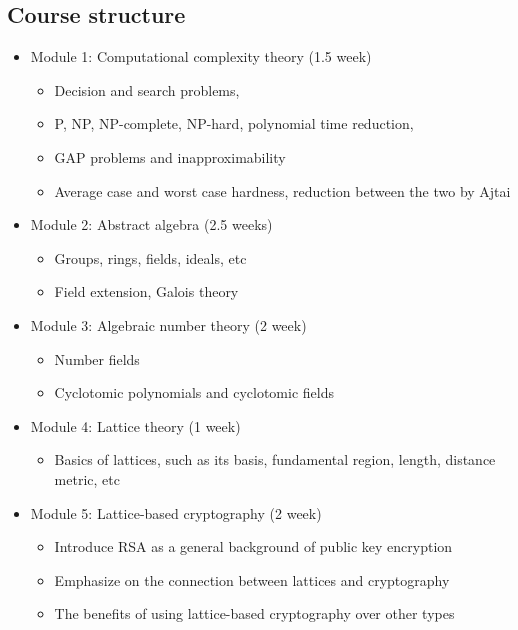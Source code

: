 \documentclass[../main.tex]{subfiles}
\begin{document}
\subsection{Course structure}

\begin{itemize}
    \item Module 1: Computational complexity theory (1.5 week)
        \begin{itemize}
            \item Decision and search problems, 
            \item P, NP, NP-complete, NP-hard, polynomial time reduction, 
            \item GAP problems and inapproximability
            \item Average case and worst case hardness, reduction between the two by Ajtai 
        \end{itemize}
    \item Module 2: Abstract algebra (2.5 weeks)
        \begin{itemize}
            \item Groups, rings, fields, ideals, etc 
            \item Field extension, Galois theory
        \end{itemize}
    \item Module 3: Algebraic number theory (2 week)
        \begin{itemize}
            \item Number fields
            \item Cyclotomic polynomials and cyclotomic fields 
        \end{itemize}
    \item Module 4: Lattice theory (1 week) 
        \begin{itemize}
            \item Basics of lattices, such as its basis, fundamental region, length, distance metric, etc
        \end{itemize}
    \item Module 5: Lattice-based cryptography (2 week) 
        \begin{itemize}
            \item Introduce RSA as a general background of public key encryption  
            \item Emphasize on the connection between lattices and cryptography
            \item The benefits of using lattice-based cryptography over other types 

\end{itemize}
\end{itemize}
\end{document}
